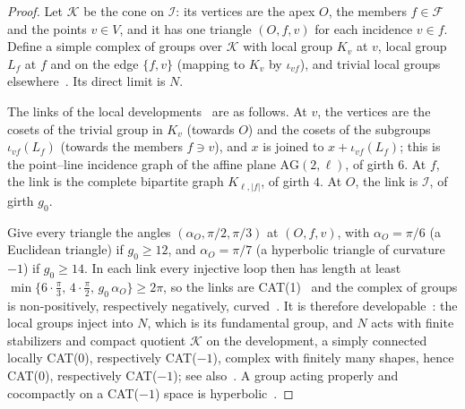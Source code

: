 \documentclass[11pt]{article}
\theoremstyle{definition}
\theoremstyle{plain}
\begin{document}
\begin{proof}
Let $\mathcal K$ be the cone on $\mathcal I$: its vertices are the apex $O$, the members $f\in\mathcal F$ and the points $v\in V$, and it has one triangle $(O,f,v)$ for each incidence $v\in f$. Define a simple complex of groups over $\mathcal K$ with local group $K_v$ at $v$, local group $L_f$ at $f$ and on the edge $\{f,v\}$ (mapping to $K_v$ by $\iota_{vf}$), and trivial local groups elsewhere~\cite[\S II.12]{BridsonHaefliger1999}. Its direct limit is $N$.

The links of the local developments~\cite[\S\S II.12, III.C.4]{BridsonHaefliger1999} are as follows. At $v$, the vertices are the cosets of the trivial group in $K_v$ (towards $O$) and the cosets of the subgroups $\iota_{vf}(L_f)$ (towards the members $f\ni v$), and $x$ is joined to $x+\iota_{vf}(L_f)$; this is the point--line incidence graph of the affine plane $\mathrm{AG}(2,\ell)$, of girth $6$. At $f$, the link is the complete bipartite graph $K_{\ell,|f|}$, of girth $4$. At $O$, the link is $\mathcal I$, of girth $g_0$.

Give every triangle the angles $(\alpha_O,\pi/2,\pi/3)$ at $(O,f,v)$, with $\alpha_O=\pi/6$ (a Euclidean triangle) if $g_0\ge12$, and $\alpha_O=\pi/7$ (a hyperbolic triangle of curvature $-1$) if $g_0\ge14$. In each link every injective loop then has length at least $\min\{6\cdot\frac\pi3,\,4\cdot\frac\pi2,\,g_0\,\alpha_O\}\ge2\pi$, so the links are CAT(1)~\cite[II.5.6]{BridsonHaefliger1999} and the complex of groups is non-positively, respectively negatively, curved~\cite[II.5.2]{BridsonHaefliger1999}. It is therefore developable~\cite[Thm.~III.C.4.17]{BridsonHaefliger1999}: the local groups inject into $N$, which is its fundamental group, and $N$ acts with finite stabilizers and compact quotient $\mathcal K$ on the development, a simply connected locally CAT(0), respectively CAT($-1$), complex with finitely many shapes, hence CAT(0), respectively CAT($-1$); see also~\cite{Stallings1991,Haefliger1991}. A group acting properly and cocompactly on a CAT($-1$) space is hyperbolic~\cite[Prop.~III.H.1.2, Prop.~I.8.19]{BridsonHaefliger1999}.
\end{proof}
\end{document}
